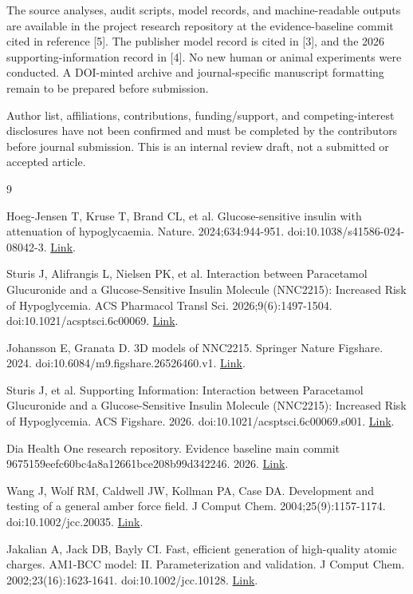 \documentclass[11pt]{article}
\begin{document}
The source analyses, audit scripts, model records, and machine-readable outputs are available in the project research repository at the evidence-baseline commit cited in reference [5]. The publisher model record is cited in [3], and the 2026 supporting-information record in [4]. No new human or animal experiments were conducted. A DOI-minted archive and journal-specific manuscript formatting remain to be prepared before submission.

Author list, affiliations, contributions, funding/support, and competing-interest disclosures have not been confirmed and must be completed by the contributors before journal submission. This is an internal review draft, not a submitted or accepted article.

\newpage
\begin{thebibliography}{9}
\small

 Hoeg-Jensen T, Kruse T, Brand CL, et al. Glucose-sensitive insulin with attenuation of hypoglycaemia. Nature. 2024;634:944-951. doi:10.1038/s41586-024-08042-3. \href{https://doi.org/10.1038/s41586-024-08042-3}{Link}.

 Sturis J, Alifrangis L, Nielsen PK, et al. Interaction between Paracetamol Glucuronide and a Glucose-Sensitive Insulin Molecule (NNC2215): Increased Risk of Hypoglycemia. ACS Pharmacol Transl Sci. 2026;9(6):1497-1504. doi:10.1021/acsptsci.6c00069. \href{https://doi.org/10.1021/acsptsci.6c00069}{Link}.

 Johansson E, Granata D. 3D models of NNC2215. Springer Nature Figshare. 2024. doi:10.6084/m9.figshare.26526460.v1. \href{https://doi.org/10.6084/m9.figshare.26526460.v1}{Link}.

 Sturis J, et al. Supporting Information: Interaction between Paracetamol Glucuronide and a Glucose-Sensitive Insulin Molecule (NNC2215): Increased Risk of Hypoglycemia. ACS Figshare. 2026. doi:10.1021/acsptsci.6c00069.s001. \href{https://doi.org/10.1021/acsptsci.6c00069.s001}{Link}.

 Dia Health One research repository. Evidence baseline main commit 9675159eefc60bc4a8a12661bce208b99d342246. 2026. \href{https://github.com/pallagip/dia-health-one/tree/9675159eefc60bc4a8a12661bce208b99d342246/research}{Link}.

 Wang J, Wolf RM, Caldwell JW, Kollman PA, Case DA. Development and testing of a general amber force field. J Comput Chem. 2004;25(9):1157-1174. doi:10.1002/jcc.20035. \href{https://doi.org/10.1002/jcc.20035}{Link}.

 Jakalian A, Jack DB, Bayly CI. Fast, efficient generation of high-quality atomic charges. AM1-BCC model: II. Parameterization and validation. J Comput Chem. 2002;23(16):1623-1641. doi:10.1002/jcc.10128. \href{https://doi.org/10.1002/jcc.10128}{Link}.

\end{thebibliography}
\end{document}
